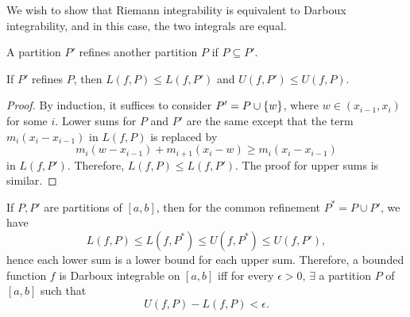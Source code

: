 We wish to show that Riemann integrability is equivalent to Darboux integrability, and in this case, the two integrals are equal.

\begin{df}
    A partition $P'$ refines another partition $P$ if $P \subseteq P'$.
\end{df}

\begin{lm}
    If $P'$ refines $P$, then $L(f, P) \leq L(f, P')$ and $U(f, P') \leq U(f, P)$.
    \begin{proof}
        By induction, it suffices to consider $P' = P \cup {\left\{{w}\right\}}$, where $w \in (x_{i-1}, x_i)$ for some $i$. Lower sums for $P$ and $P'$ are the same except that the term $m_i (x_i - x_{i-1})$ in $L(f, P)$ is replaced by
        \[
        m_i (w - x_{i-1}) + m_{i+1} (x_i - w) \geq m_i (x_i - x_{i-1})
        \]
        in $L(f, P')$. Therefore, $L(f, P) \leq L(f, P')$. The proof for upper sums is similar.
    \end{proof}
\end{lm}

If $P, P'$ are partitions of $[a, b]$, then for the common refinement $P^* = P \cup P'$, we have
\[
L(f, P) \leq L(f, P^*) \leq U(f, P^*) \leq U(f, P'),
\]
hence each lower sum is a lower bound for each upper sum. Therefore, a bounded function $f$ is Darboux integrable on $[a, b]$ iff for every $\epsilon > 0$, $\exists$ a partition $P$ of $[a, b]$ such that
\[
U(f, P) - L(f, P) < \epsilon.
\]

